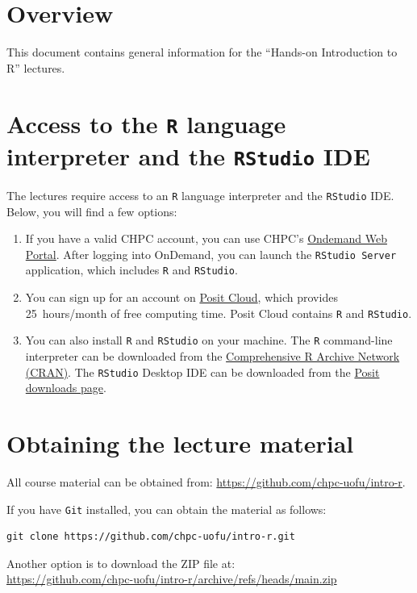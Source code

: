 \section*{Overview}

This document contains general information for the ``Hands-on Introduction to R'' lectures.

\section{Access to the \texttt{R} language interpreter and the \texttt{RStudio} IDE}

The lectures require access to an \texttt{R} language interpreter and the \texttt{RStudio} IDE.
Below, you will find a few options:

\begin{enumerate}
  \item If you have a valid CHPC account, you can use CHPC's
        \href{http://ondemand.chpc.utah.edu/}{Ondemand Web Portal}.
        After logging into OnDemand, you can launch the \texttt{RStudio Server} application,
        which includes \texttt{R} and \texttt{RStudio}.

  \item You can sign up for an account on
        \href{https://posit.cloud/}{Posit Cloud},
        which provides 25~hours/month of free computing time.
        Posit Cloud contains \texttt{R} and \texttt{RStudio}.

  \item You can also install \texttt{R} and \texttt{RStudio} on your machine.
        The \texttt{R} command-line interpreter can be downloaded from the
        \href{https://cran.r-project.org/}{Comprehensive R Archive Network (CRAN)}.
        The \texttt{RStudio} Desktop IDE can be downloaded from the
        \href{https://posit.co/downloads/}{Posit downloads page}.
\end{enumerate}


\section{Obtaining the lecture material}

All course material can be obtained from:
\href{https://github.com/chpc-uofu/intro-r}{https://github.com/chpc-uofu/intro-r}.

If you have \texttt{Git} installed, you can obtain the material as follows:
\begin{verbatim}
git clone https://github.com/chpc-uofu/intro-r.git
\end{verbatim}

Another option is to download the ZIP file at:\\
\href{https://github.com/chpc-uofu/intro-r/archive/refs/heads/main.zip}{%
  https://github.com/chpc-uofu/intro-r/archive/refs/heads/main.zip}

